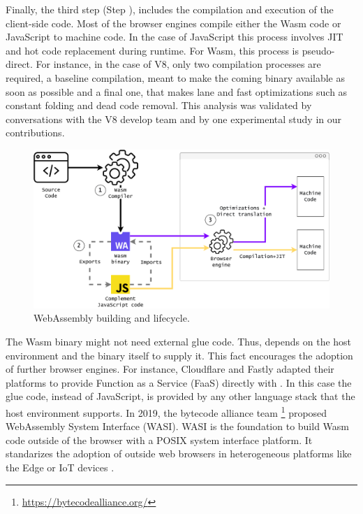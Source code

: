 Finally, the third step (Step ), includes the compilation and execution of the client-side code. Most of the browser engines compile either the Wasm code or JavaScript to machine code. In the case of JavaScript this process involves JIT and hot code replacement during runtime. For Wasm, this process is pseudo-direct. For instance, in the case of V8, only two compilation processes are required, a baseline compilation, meant to make the coming binary available as soon as possible and a final one, that makes lane and fast optimizations such as constant folding and dead code removal. This analysis was validated by conversations with the V8 develop team and by one experimental study in our contributions.  

\begin{figure}[h]
    \centering
    \includegraphics[width=\linewidth]{diagrams/wasm_workflow.pdf}
    \caption{WebAssembly building and lifecycle. }
    \label{diagrams:sota:wasm}
\end{figure}

The Wasm binary might not need external glue code. Thus, depends on the host environment and the binary itself to supply it. This fact encourages the adoption of \wasm further browser engines. For instance, Cloudflare and Fastly adapted their platforms to provide Function as a Service (FaaS) directly with \wasm. In this case the glue code, instead of JavaScript, is provided by any other language stack that the host environment supports.
In 2019, the bytecode alliance team \footnote{\url{https://bytecodealliance.org/}} proposed WebAssembly System Interface (WASI). WASI is the foundation to build Wasm code outside of the browser with a POSIX system interface platform. It standarizes the adoption of \wasm outside web browsers \cite{bryant2020webassembly} in heterogeneous platforms like the Edge or IoT devices \cite{Narayan2021Swivel,Sledge}. 

